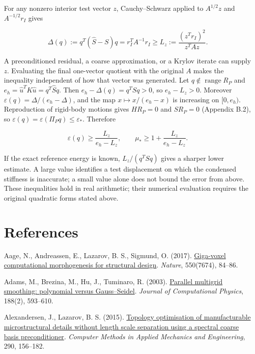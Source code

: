 \documentclass[preprint,12pt,authoryear]{elsarticle}
\begin{document}
For any nonzero interior test vector \(z\), Cauchy--Schwarz applied to \(A^{1/2}z\) and \(A^{-1/2}r_I\) gives

\[
\Delta(q):=q^T(\widehat S-S)q=r_I^TA^{-1}r_I
\ge L_z:=\frac{(z^Tr_I)^2}{z^TAz}.
\tag{I.1}
\]

A preconditioned residual, a coarse approximation, or a Krylov iterate can supply \(z\). Evaluating the final one-vector quotient with the original \(A\) makes the inequality independent of how that vector was generated. Let \(q\notin\operatorname{range}R_P\) and \(e_h=\widehat u^TK\widehat u=q^T\widehat Sq\). Then \(e_h-\Delta(q)=q^TSq>0\), so \(e_h-L_z>0\). Moreover \(\varepsilon(q)=\Delta/(e_h-\Delta)\), and the map \(x\mapsto x/(e_h-x)\) is increasing on \([0,e_h)\). Reproduction of rigid-body motions gives \(HR_P=0\) and \(SR_P=0\) (Appendix B.2), so \(\varepsilon(q)=\varepsilon(\Pi_Pq)\le\varepsilon_*\). Therefore

\[
\varepsilon(q)\ge\frac{L_z}{e_h-L_z},\qquad
\mu_*\ge1+\frac{L_z}{e_h-L_z}.
\tag{I.2}
\]

If the exact reference energy is known, \(L_z/(q^TSq)\) gives a sharper lower estimate. A large value identifies a test displacement on which the condensed stiffness is inaccurate; a small value alone does not bound the error from above. These inequalities hold in real arithmetic; their numerical evaluation requires the original quadratic forms stated above.

\section*{References}
\begingroup\small\setlength{\parindent}{0pt}\setlength{\parskip}{3pt}
Aage, N., Andreassen, E., Lazarov, B. S., Sigmund, O. (2017). \href{https://doi.org/10.1038/nature23911}{Giga-voxel computational morphogenesis for structural design}. \emph{Nature}, 550(7674), 84--86.

Adams, M., Brezina, M., Hu, J., Tuminaro, R. (2003). \href{https://doi.org/10.1016/s0021-9991(03)00194-3}{Parallel multigrid smoothing: polynomial versus Gauss--Seidel}. \emph{Journal of Computational Physics}, 188(2), 593--610.

Alexandersen, J., Lazarov, B. S. (2015). \href{https://doi.org/10.1016/j.cma.2015.02.028}{Topology optimisation of manufacturable microstructural details without length scale separation using a spectral coarse basis preconditioner}. \emph{Computer Methods in Applied Mechanics and Engineering}, 290, 156--182.
\end{document}

